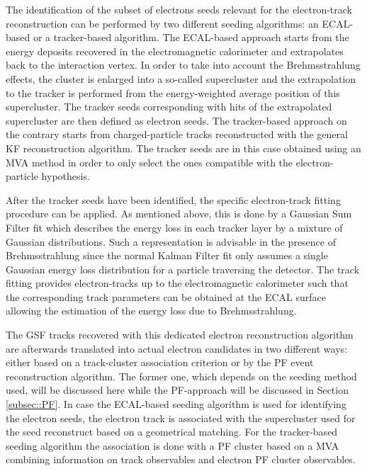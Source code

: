 The identification of the subset of electrons seeds relevant for the electron-track reconstruction can be performed by two different seeding algorithms: an ECAL-based or a tracker-based algorithm.
The ECAL-based approach starts from the energy deposits recovered in the electromagnetic calorimeter and extrapolates back to the interaction vertex. In order to take into account the Brehmsstrahlung effects, the cluster is enlarged into a so-called supercluster and the extrapolation to the tracker is performed from the energy-weighted average position of this supercluster. The tracker seeds corresponding with hits of the extrapolated supercluster are then defined as electron seeds. The tracker-based approach on the contrary starts from charged-particle tracks reconstructed with the general KF reconstruction algorithm. The tracker seeds are in this case obtained using an MVA method in order to only select the ones compatible with the electron-particle hypothesis.

After the tracker seeds have been identified, the specific electron-track fitting procedure can be applied. As mentioned above, this is done by a Gaussian Sum Filter fit which describes the energy loss in each tracker layer by a mixture of Gaussian distributions. Such a representation is advisable in the presence of Brehmsstrahlung since the normal Kalman Filter fit only assumes a single Gaussian energy loss distribution for a particle traversing the detector. The track fitting provides electron-tracks up to the electromagnetic calorimeter such that the corresponding track parameters can be obtained at the ECAL surface allowing the estimation of the energy loss due to Brehmsstrahlung.

The GSF tracks recovered with this dedicated electron reconstruction algorithm are afterwards translated into actual electron candidates in two different ways: either based on a track-cluster association criterion or by the PF event reconstruction algorithm. The former one, which depends on the seeding method used, will be discussed here while the PF-approach will be discussed in Section \ref{subsec::PF}.
In case the ECAL-based seeding algorithm is used for identifying the electron seeds, the electron track is associated with the supercluster used for the seed reconstruct based on a geometrical matching. For the tracker-based seeding algorithm the association is done with a PF cluster based on a MVA combining information on track observables and electron PF cluster observables. %

